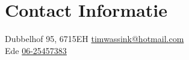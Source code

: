 \section{\sc Contact Informatie}
Dubbelhof 95, 6715EH      \hfill \href{mailto:timwassink@hotmail.com}{timwassink@hotmail.com}\\
Ede							 \hfill \href{tel:+31625457383}{06-25457383}\\


